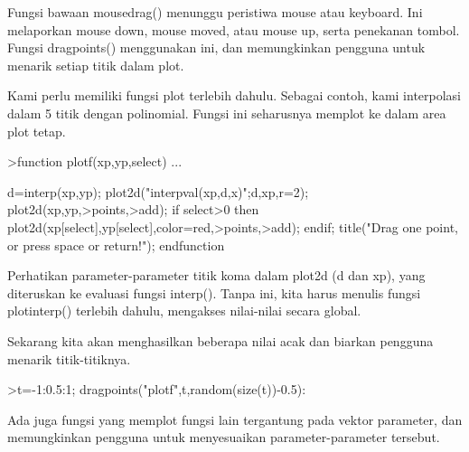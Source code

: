 \documentclass[a4paper,10pt]{article}
\begin{document}
\begin{eulernotebook}
\begin{eulercomment}
\begin{eulercomment}
\begin{eulercomment}
\begin{eulercomment}
\begin{eulercomment}
\begin{eulercomment}
\begin{eulercomment}
Fungsi bawaan mousedrag() menunggu peristiwa mouse atau keyboard. Ini
melaporkan mouse down, mouse moved, atau mouse up, serta penekanan
tombol. Fungsi dragpoints() menggunakan ini, dan memungkinkan pengguna
untuk menarik setiap titik dalam plot.

Kami perlu memiliki fungsi plot terlebih dahulu. Sebagai contoh, kami
interpolasi dalam 5 titik dengan polinomial. Fungsi ini seharusnya
memplot ke dalam area plot tetap.
\end{eulercomment}
\begin{eulerprompt}
>function plotf(xp,yp,select) ...
\end{eulerprompt}
\begin{eulerudf}
    d=interp(xp,yp);
    plot2d("interpval(xp,d,x)";d,xp,r=2);
    plot2d(xp,yp,>points,>add);
    if select>0 then
      plot2d(xp[select],yp[select],color=red,>points,>add);
    endif;
    title("Drag one point, or press space or return!");
  endfunction
\end{eulerudf}
\begin{eulercomment}
Perhatikan parameter-parameter titik koma dalam plot2d (d dan xp),
yang diteruskan ke evaluasi fungsi interp(). Tanpa ini, kita harus
menulis fungsi plotinterp() terlebih dahulu, mengakses nilai-nilai
secara global.

Sekarang kita akan menghasilkan beberapa nilai acak dan biarkan
pengguna menarik titik-titiknya.
\end{eulercomment}
\begin{eulerprompt}
>t=-1:0.5:1; dragpoints("plotf",t,random(size(t))-0.5):
\end{eulerprompt}
\begin{eulercomment}
Ada juga fungsi yang memplot fungsi lain tergantung pada vektor
parameter, dan memungkinkan pengguna untuk menyesuaikan
parameter-parameter tersebut.


\end{eulercomment}
\end{eulercomment}
\end{eulercomment}
\end{eulercomment}
\end{eulercomment}
\end{eulercomment}
\end{eulercomment}
\end{eulernotebook}
\end{document}
